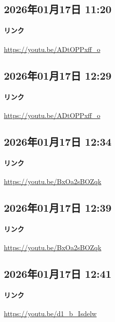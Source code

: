 \subsection*{2026年01月17日 11:20}

\paragraph{リンク}
\url{https://youtu.be/ADtOPPxff_o}

\subsection*{2026年01月17日 12:29}

\paragraph{リンク}
\url{https://youtu.be/ADtOPPxff_o}

\subsection*{2026年01月17日 12:34}

\paragraph{リンク}
\url{https://youtu.be/BxOa2sBOZqk}

\subsection*{2026年01月17日 12:39}

\paragraph{リンク}
\url{https://youtu.be/BxOa2sBOZqk}

\subsection*{2026年01月17日 12:41}

\paragraph{リンク}
\url{https://youtu.be/d1_b_Isdelw}

